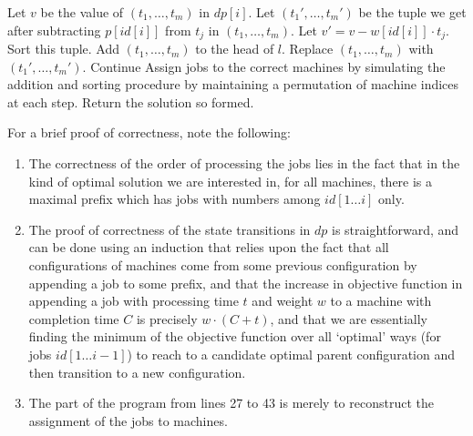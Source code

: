 \documentclass[a4paper]{article}
\begin{document}
\begin{algorithmic}[1]
            \State Let $v$ be the value of $(t_1, \ldots, t_m)$ in $dp[i]$.
                \State Let $(t_1', \ldots, t_m')$ be the tuple we get after subtracting $p[id[i]]$ from $t_j$ in $(t_1, \ldots, t_m)$.
                \State Let $v' = v - w[id[i]] \cdot t_j$.
                \State Sort this tuple.
                    \State Add $(t_1, \ldots, t_m)$ to the head of $l$.
                    \State Replace $(t_1, \ldots, t_m)$ with $(t_1', \ldots, t_m')$.
                    \State Continue
                \EndIf
            \EndFor
        \EndFor
        \State {}
        \State Assign jobs to the correct machines by simulating the addition and sorting procedure by maintaining a permutation of machine indices at each step.
        \State Return the solution so formed.
    \EndFunction
\end{algorithmic}
For a brief proof of correctness, note the following:
\begin{enumerate}
    \item The correctness of the order of processing the jobs lies in the fact that in the kind of optimal solution we are interested in, for all machines, there is a maximal prefix which has jobs
        with numbers among $id[1 \ldots i]$ only.
    \item The proof of correctness of the state transitions in $dp$ is straightforward, and can be done using an induction that relies upon the fact that all configurations of
        machines come from some previous configuration by appending a job to some prefix, and that the increase in objective function in appending a job with processing time $t$ and
        weight $w$ to a machine with completion time $C$ is precisely $w \cdot (C + t)$, and that we are essentially finding the minimum of the objective function over all `optimal' ways (for jobs
        $id[1 \ldots i - 1]$) to reach to a candidate optimal parent configuration and then transition to a new configuration.
    \item The part of the program from lines 27 to 43 is merely to reconstruct the assignment of the jobs to machines.
\end{enumerate}
\end{document}
